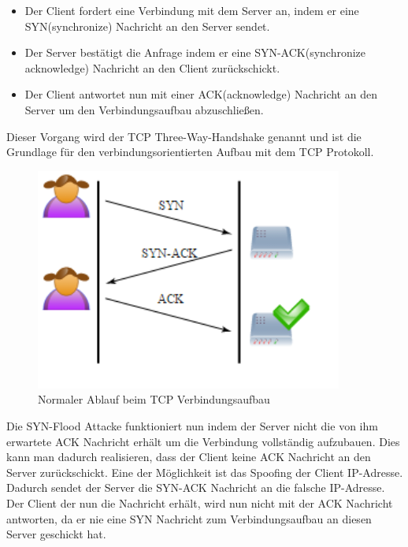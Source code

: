 \begin{itemize}
	\item Der Client fordert eine Verbindung mit dem Server an, indem er eine SYN(synchronize) Nachricht an den Server sendet.
	\item Der Server bestätigt die Anfrage indem er eine SYN-ACK(synchronize acknowledge) Nachricht an den Client zurückschickt. 
	\item Der Client antwortet nun mit einer ACK(acknowledge) Nachricht an den Server um den Verbindungsaufbau abzuschließen.
\end{itemize}
Dieser Vorgang wird der TCP Three-Way-Handshake genannt und ist die Grundlage für den verbindungsorientierten Aufbau mit dem TCP Protokoll.
	\begin{figure}[H]
		\centering
		\includegraphics[width=0.9\textwidth]{images/dos/three_way_handshake.png}
		\caption{Normaler Ablauf beim TCP Verbindungsaufbau}
		\label{fig:three way handshake}
	\end{figure}

Die SYN-Flood Attacke funktioniert nun indem der Server nicht die von ihm erwartete ACK Nachricht erhält um die Verbindung vollständig aufzubauen.
Dies kann man dadurch realisieren, dass der Client keine ACK Nachricht an den Server zurückschickt. Eine der Möglichkeit ist das Spoofing der Client IP-Adresse. Dadurch sendet der Server die SYN-ACK Nachricht an die falsche IP-Adresse. Der Client der nun die Nachricht erhält, wird nun nicht mit der ACK Nachricht antworten, da er nie eine SYN Nachricht zum Verbindungsaufbau an diesen Server geschickt hat.

